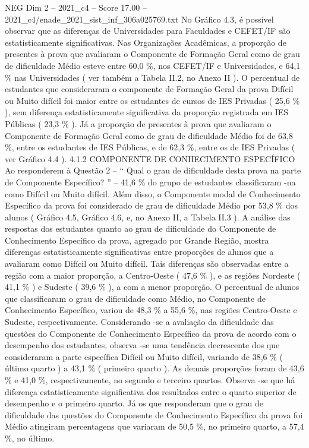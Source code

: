 \begin{textsample}{NEG Dim 2 – 2021\_c4 – Score 17.00 – 2021\_c4/enade\_2021\_sist\_inf\_306a025769.txt}
No Gráfico 4.3, é possível observar que as diferenças de Universidades para Faculdades e CEFET/IF são estatisticamente significativas.
Nas Organizações Acadêmicas, a proporção de presentes à prova que avaliaram o Componente de Formação Geral como de grau de dificuldade Médio esteve entre 60,0 \%, nos CEFET/IF e Universidades, e 64,1 \% nas Universidades ( ver também a Tabela II.2, no Anexo II ).
O percentual de estudantes que consideraram o componente de Formação Geral da prova Difícil ou Muito difícil foi maior entre os estudantes de cursos de IES Privadas ( 25,6 \% ), sem diferença estatisticamente significativa da proporção registrada em IES Públicas ( 23,3 \% ).
Já a proporção de presentes à prova que avaliaram o Componente de Formação Geral como de grau de dificuldade Médio foi de 63,8 \%, entre os estudantes de IES Públicas, e de 62,3 \%, entre os de IES Privadas ( ver Gráfico 4.4 ). 4.1.2 COMPONENTE DE CONHECIMENTO ESPECÍFICO Ao responderem à Questão 2 – “ Qual o grau de dificuldade desta prova na parte de Componente Específico? ” – 41,6 \% do grupo de estudantes classificaram -na como Difícil ou Muito difícil.
Além disso, o Componente modal de Conhecimento Específico da prova foi considerado de grau de dificuldade Médio por 53,8 \% dos alunos ( Gráfico 4.5, Gráfico 4.6, e, no Anexo II, a Tabela II.3 ).
A análise das respostas dos estudantes quanto ao grau de dificuldade do Componente de Conhecimento Específico da prova, agregado por Grande Região, mostra diferenças estatisticamente significativas entre proporções de alunos que a avaliaram como Difícil ou Muito difícil.
Tais diferenças são observadas entre a região com a maior proporção, a Centro-Oeste ( 47,6 \% ), e as regiões Nordeste ( 41,1 \% ) e Sudeste ( 39,6 \% ), a com a menor proporção.
O percentual de alunos que classificaram o grau de dificuldade como Médio, no Componente de Conhecimento Específico, variou de 48,3 \% a 55,6 \%, nas regiões Centro-Oeste e Sudeste, respectivamente.
Considerando -se a avaliação da dificuldade das questões do Componente de Conhecimento Específico da prova de acordo com o desempenho dos estudantes, observa -se uma tendência decrescente dos que consideraram a parte específica Difícil ou Muito difícil, variando de 38,6 \% ( último quarto ) a 43,1 \% ( primeiro quarto ).
As demais proporções foram de 43,6 \% e 41,0 \%, respectivamente, no segundo e terceiro quartos.
Observa -se que há diferença estatisticamente significativa dos resultados entre o quarto superior de desempenho e o primeiro quarto.
Já os que responderam que o grau de dificuldade das questões do Componente de Conhecimento Específico da prova foi Médio atingiram percentagens que variaram de 50,5 \%, no primeiro quarto, a 57,4 \%, no último.

\end{textsample}
